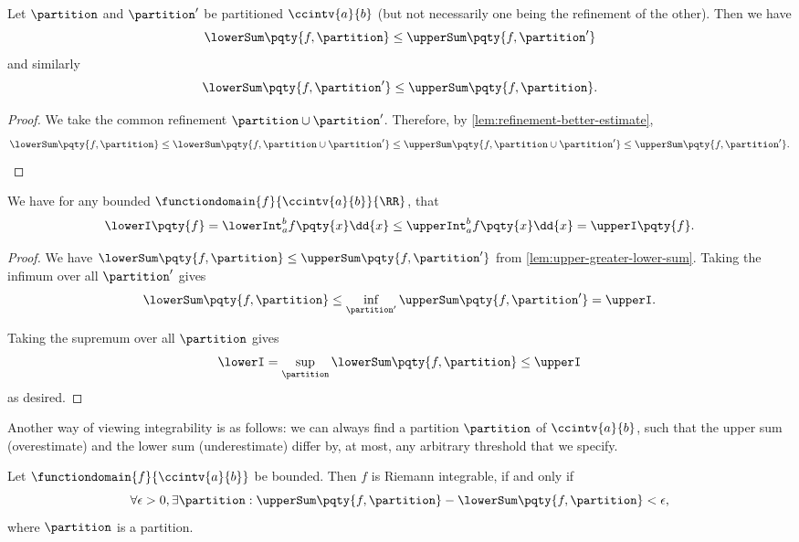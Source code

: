 \begin{lemma}
    \label{lem:upper-greater-lower-sum}%
    Let \(\partition\) and \(\partition'\) be partitioned \(\ccintv{a}{b}\) (but not necessarily one being the refinement of the other). Then we have
    \[
        \lowerSum\pqty{f, \partition} \leq \upperSum\pqty{f, \partition'}
    \]
    and similarly
    \[
        \lowerSum\pqty{f, \partition'} \leq \upperSum\pqty{f, \partition}.
    \]
\end{lemma}

\begin{proof}
    We take the common refinement \(\partition \cup \partition'\). Therefore, by \autoref{lem:refinement-better-estimate},
    \[
        \lowerSum\pqty{f, \partition} \leq \lowerSum\pqty{f, \partition \cup \partition'} \leq \upperSum\pqty{f, \partition \cup \partition'} \leq \upperSum\pqty{f, \partition'}.
    \]
\end{proof}

\begin{corollary}
    \label{cor:upper-greater-lower-int}%
    We have for any bounded \(\functiondomain{f}{\ccintv{a}{b}}{\RR}\), that
    \[
        \lowerI\pqty{f} = \lowerInt_{a}^{b} f\pqty{x} \dd{x} \leq \upperInt_{a}^{b} f\pqty{x} \dd{x} = \upperI \pqty{f}.
    \]
\end{corollary}

\begin{proof}
    We have \(\lowerSum\pqty{f, \partition} \leq \upperSum\pqty{f, \partition'}\) from \autoref{lem:upper-greater-lower-sum}. Taking the infimum over all \(\partition'\) gives
    \[
        \lowerSum\pqty{f, \partition} \leq \inf_{\partition'} \upperSum\pqty{f, \partition'} = \upperI.
    \]

    Taking the supremum over all \(\partition\) gives
    \[
        \lowerI = \sup_{\partition} \lowerSum\pqty{f, \partition} \leq \upperI
    \]
    as desired.
\end{proof}

Another way of viewing integrability is as follows: we can always find a partition \(\partition\) of \(\ccintv{a}{b}\), such that the upper sum (overestimate) and the lower sum (underestimate) differ by, at most, any arbitrary threshold that we specify.

\begin{proposition}
    \label{prop:riemann-integrability-criteria}%
    Let \(\functiondomain{f}{\ccintv{a}{b}}\) be bounded. Then \(f\) is Riemann integrable, if and only if
    \[
        \forall \epsilon > 0, \exists \partition: \upperSum\pqty{f, \partition} - \lowerSum\pqty{f, \partition} < \epsilon,
    \]
    where \(\partition\) is a partition.
\end{proposition}

